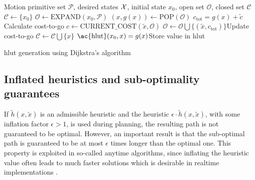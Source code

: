 \begin{algorithm}
    \begin{algorithmic}
        \Require Motion primitive set $\mathcal{P}$, desired states $\mathcal{X}$, initial state $x_0$, open set $\mathcal{O}$, closed set $\mathcal{C}$
            \State $\mathcal{C}\gets \{x_0\}$
            \State $\mathcal{O}\gets\text{EXPAND}(x_0, \mathcal{P})$
                \State $(x,g(x))\gets \text{POP}(\mathcal{O})$
                        \State $c_{\text{tot}}=g(x) + \tilde{c}$ \Comment Calculate cost-to-go
                        \State $c\gets\text{CURRENT\_COST}(\tilde{x}, \mathcal{O})$
                            \State $\mathcal{O}\gets\mathcal{O}\bigcup\{(\tilde{x},c_{\text{tot}})\}$\Comment Update cost-to-go
                        \EndIf
                    \EndIf
                \EndFor
            \State $\mathcal{C}\gets\mathcal{C}\bigcup \{x\}$
            \State $\text{\ac{hlut}}(x_0,x)=g(x)$\Comment Store value in \ac{hlut}
            \EndWhile
        \end{algorithmic}
        \caption{\ac{hlut} generation using Dijkstra's algorithm}
        \label{alg:hlut}
\end{algorithm}

\subsection{Inflated heuristics and sub-optimality guarantees}\label{sec:sub_optimal}
If $\tilde{h}(x, \tilde{x})$ is an admissible heuristic and the heuristic $\epsilon\cdot\tilde{h}(x, \tilde{x})$, with some inflation factor $\epsilon>1$, is used during planning,
the resulting path is not guaranteed to be optimal. However, an important result is that the sub-optimal path is guaranteed to be at most $\epsilon$ times 
longer than the optimal one. This property is exploited in so-called anytime algorithms, since inflating the heuristic value often leads to much faster solutions which is 
desirable in realtime implementations \cite{anytime_astar}. 